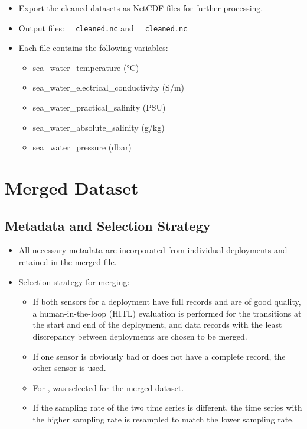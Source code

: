 \begin{itemize}
\item Export the cleaned datasets as NetCDF files for further processing.
\item Output files: 
\texttt{\projectname\casenumber\_\FirstInstrument\_cleaned.nc} 
and \texttt{\projectname\casenumber\_\SecondInstrument\_cleaned.nc}
\item Each file contains the following variables:
\begin{itemize}
    \item sea\_water\_temperature (°C)
    \item sea\_water\_electrical\_conductivity (S/m)
    \item sea\_water\_practical\_salinity (PSU)
    \item sea\_water\_absolute\_salinity (g/kg)
    \item sea\_water\_pressure (dbar)
\end{itemize}
\end{itemize}   

\section{Merged Dataset}

\subsection{Metadata and Selection Strategy}
\begin{itemize}
    \item All necessary metadata are incorporated from individual deployments and retained in the merged file.
    \item Selection strategy for merging:
    \begin{itemize}
        \item If both sensors for a deployment have full records and are of good quality, 
        a human-in-the-loop (HITL) evaluation is performed for the transitions at the start and end of the deployment, 
        and data records with the least discrepancy between deployments are chosen to be merged. 
        \item If one sensor is obviously bad or does not have a complete record, the other sensor is used.
        \item For \displayprojectname{} \casenumber{}, \CurrentDeploymentInstrument{} was selected for the merged dataset.
        \item If the sampling rate of the two time series is different, the time series with the higher sampling rate is resampled to match the lower sampling rate.
    \end{itemize}
\end{itemize}

